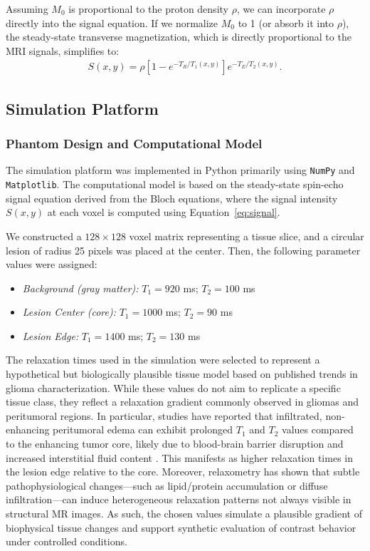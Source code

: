 \documentclass[10pt,a4paper,twoside]{article}
\begin{document}
Assuming $M_0$ is proportional to the proton density $\rho$, we can incorporate $\rho$ directly into the signal equation. If we normalize $M_0$ to 1 (or absorb it into $\rho$), the steady-state transverse magnetization, which is directly proportional to the MRI signals, simplifies to:
\begin{align*}
S(x, y) = \rho \left[ 1 - e^{-T_R/T_1(x, y)}\right] e^{-T_E/T_2(x, y)}. \tag{1}
\end{align*}

\subsection{Simulation Platform}

\subsubsection{Phantom Design and Computational Model}
The simulation platform was implemented in Python primarily using \texttt{NumPy} and \texttt{Matplotlib}. The computational model is based on the steady-state spin-echo signal equation derived from the Bloch equations, where the signal intensity \( S(x,y) \) at each voxel is computed using Equation~\eqref{eq:signal}. 

We constructed a \(128 \times 128\) voxel matrix representing a tissue slice, and a circular lesion of radius 25 pixels was placed at the center. Then, the following parameter values were assigned:

\begin{itemize}
    \item \textit{Background (gray matter):} \(T_1 = 920\) ms; \(T_2 = 100\) ms
    \item \textit{Lesion Center (core):} \(T_1 = 1000\) ms; \(T_2 = 90\) ms
    \item \textit{Lesion Edge:} \(T_1 = 1400\) ms; \(T_2 = 130\) ms
\end{itemize}

The relaxation times used in the simulation were selected to represent a hypothetical but biologically plausible tissue model based on published trends in glioma characterization. While these values do not aim to replicate a specific tissue class, they reflect a relaxation gradient commonly observed in gliomas and peritumoral regions. In particular, studies have reported that infiltrated, non-enhancing peritumoral edema can exhibit prolonged \( T_1 \) and \( T_2 \) values compared to the enhancing tumor core, likely due to blood-brain barrier disruption and increased interstitial fluid content \cite{englund1986,blystad2017}. This manifests as higher relaxation times in the lesion edge relative to the core. Moreover, relaxometry has shown that subtle pathophysiological changes---such as lipid/protein accumulation or diffuse infiltration---can induce heterogeneous relaxation patterns not always visible in structural MR images. As such, the chosen values simulate a plausible gradient of biophysical tissue changes and support synthetic evaluation of contrast behavior under controlled conditions.
\end{document}
